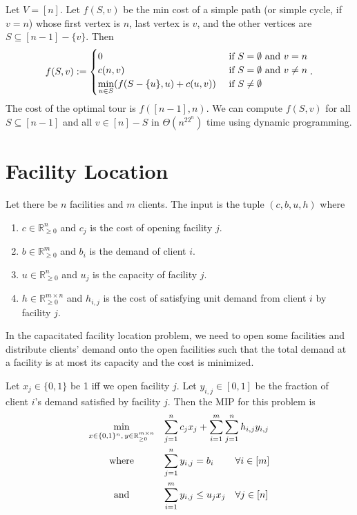 \documentclass[a4paper,12pt,fleqn]{article}
\newenvironment*{tightenum}{\begin{enumerate}[noitemsep]}{\end{enumerate}}
\newcommand*{\Rpos}{\mathbb{R}_{\ge 0}}
\newcommand*{\optprog}[3]{
\begin{array}{{>{\displaystyle}c}*2{>{\displaystyle}l}}
#1 & \multicolumn{2}{>{\displaystyle}l}{#2}
#3 \end{array}}
\begin{document}
\begin{lemma}[DP]
Let $V = [n]$. Let $f(S, v)$ be the min cost of a simple path (or simple cycle, if $v = n$)
whose first vertex is $n$, last vertex is $v$,
and the other vertices are $S \subseteq [n-1] - \{v\}$. Then
\[ f(S, v) := \begin{cases}
0 & \textrm{ if } S = \emptyset \textrm{ and } v = n
\\ c(n, v) & \textrm{ if } S = \emptyset \textrm{ and } v \neq n
\\ \displaystyle \min_{u \in S} (f(S-\{u\}, u) + c(u, v))
    & \textrm{ if } S \neq \emptyset
\end{cases}. \]
The cost of the optimal tour is $f([n-1], n)$.
We can compute $f(S, v)$ for all $S \subseteq [n-1]$ and all $v \in [n] - S$
in $\Theta(n^22^n)$ time using dynamic programming.
\end{lemma}

\section{Facility Location}

Let there be $n$ facilities and $m$ clients. The input is the tuple $(c, b, u, h)$ where
\begin{tightenum}
\item $c \in \Rpos^n$ and $c_j$ is the cost of opening facility $j$.
\item $b \in \Rpos^m$ and $b_i$ is the demand of client $i$.
\item $u \in \Rpos^n$ and $u_j$ is the capacity of facility $j$.
\item $h \in \Rpos^{m \times n}$ and $h_{i,j}$ is the cost of satisfying
unit demand from client $i$ by facility $j$.
\end{tightenum}
In the capacitated facility location problem, we need to open some facilities
and distribute clients' demand onto the open facilities such that
the total demand at a facility is at most its capacity and the cost is minimized.

Let $x_j \in \{0, 1\}$ be 1 iff we open facility $j$.
Let $y_{i,j} \in [0, 1]$ be the fraction of client $i$'s demand satisfied by facility $j$.
Then the MIP for this problem is
\[ \optprog{\min_{x \in \{0, 1\}^n,\, y \in \Rpos^{m \times n}}}{%
\sum_{j=1}^n c_jx_j + \sum_{i=1}^m\sum_{j=1}^n h_{i,j}y_{i,j}}{
\\[1.5em] \textrm{where} & \sum_{j=1}^n y_{i,j} = b_i & \forall i \in [m]
\\[1.5em] \textrm{and} & \sum_{i=1}^m y_{i,j} \le u_jx_j & \forall j \in [n]
} \]
\end{document}
